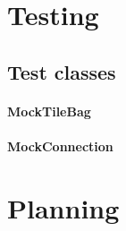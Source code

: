 \documentclass[12pt, letterpaper]{article}
\begin{document}
    \section{Testing}




    \subsection{Test classes}
    \label{subsec:testClasses}

    \paragraph{MockTileBag}

    \paragraph{MockConnection}


    \section{Planning}

\end{document}
